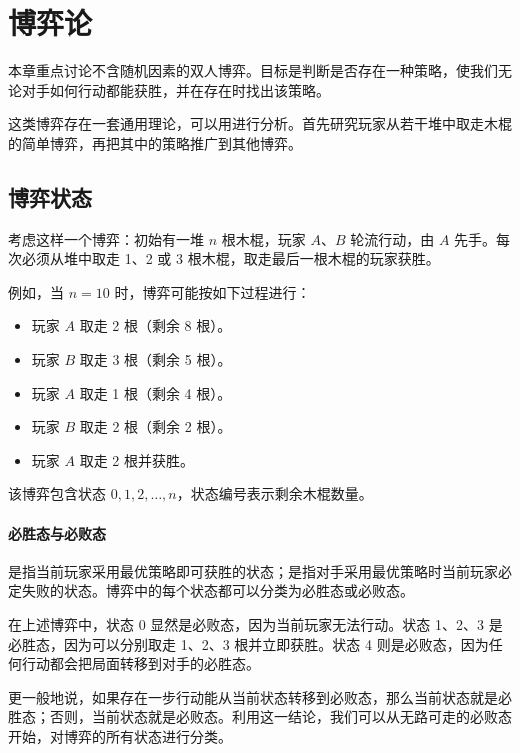 \chapter{博弈论}

本章重点讨论不含随机因素的双人博弈。目标是判断是否存在一种策略，使我们无论对手如何行动都能获胜，并在存在时找出该策略。

这类博弈存在一套通用理论，可以用进行分析。首先研究玩家从若干堆中取走木棍的简单博弈，再把其中的策略推广到其他博弈。

\section{博弈状态}

考虑这样一个博弈：初始有一堆 $n$ 根木棍，玩家 $A$、$B$ 轮流行动，由 $A$ 先手。每次必须从堆中取走 1、2 或 3 根木棍，取走最后一根木棍的玩家获胜。

例如，当 $n=10$ 时，博弈可能按如下过程进行：
\begin{itemize}[noitemsep]
\item 玩家 $A$ 取走 2 根（剩余 8 根）。
\item 玩家 $B$ 取走 3 根（剩余 5 根）。
\item 玩家 $A$ 取走 1 根（剩余 4 根）。
\item 玩家 $B$ 取走 2 根（剩余 2 根）。
\item 玩家 $A$ 取走 2 根并获胜。
\end{itemize}

该博弈包含状态 $0,1,2,\ldots,n$，状态编号表示剩余木棍数量。

\subsubsection{必胜态与必败态}


是指当前玩家采用最优策略即可获胜的状态；是指对手采用最优策略时当前玩家必定失败的状态。博弈中的每个状态都可以分类为必胜态或必败态。

在上述博弈中，状态 0 显然是必败态，因为当前玩家无法行动。状态 1、2、3 是必胜态，因为可以分别取走 1、2、3 根并立即获胜。状态 4 则是必败态，因为任何行动都会把局面转移到对手的必胜态。

更一般地说，如果存在一步行动能从当前状态转移到必败态，那么当前状态就是必胜态；否则，当前状态就是必败态。利用这一结论，我们可以从无路可走的必败态开始，对博弈的所有状态进行分类。

